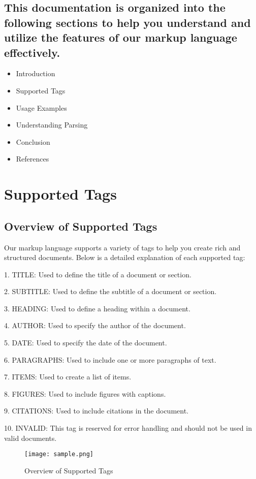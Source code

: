 \documentclass[oneside]{book}
\begin{document}
\section{This documentation is organized into the following sections to help you understand and utilize the features of our markup language effectively.}
\begin{itemize}
\item Introduction
\item Supported Tags
\item Usage Examples
\item Understanding Parsing
\item Conclusion
\item References
\end{itemize}

\newpage
\chapter{Supported Tags}
\section{Overview of Supported Tags}
Our markup language supports a variety of tags to help you create rich and structured documents. Below is a detailed explanation of each supported tag:\par
1. TITLE: Used to define the title of a document or section.\par
2. SUBTITLE: Used to define the subtitle of a document or section.\par
3. HEADING: Used to define a heading within a document.\par
4. AUTHOR: Used to specify the author of the document.\par
5. DATE: Used to specify the date of the document.\par
6. PARAGRAPHS: Used to include one or more paragraphs of text.\par
7. ITEMS: Used to create a list of items.\par
8. FIGURES: Used to include figures with captions.\par
9. CITATIONS: Used to include citations in the document.\par
10. INVALID: This tag is reserved for error handling and should not be used in valid documents.\par
\begin{figure}[h]
\centering
\texttt{[image: sample.png]}
\caption{Overview of Supported Tags}
\end{figure}
\newpage
\end{document}
